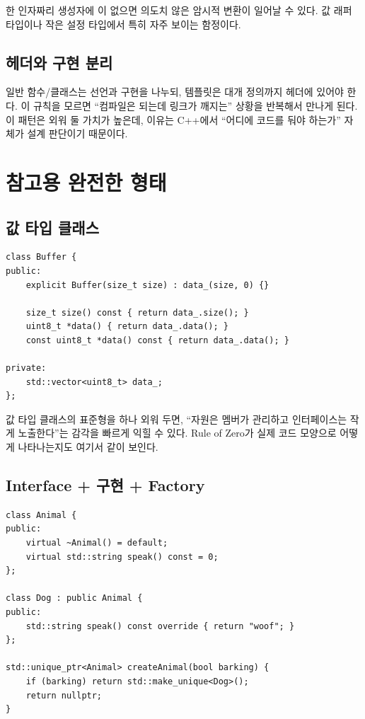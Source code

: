 \documentclass[11pt,a4paper]{book}
\DeclareRobustCommand{\code}[1]{\texttt{\detokenize{#1}}}
\begin{document}
한 인자짜리 생성자에 \code{explicit}이 없으면 의도치 않은 암시적 변환이 일어날 수 있다. 값 래퍼 타입이나 작은 설정 타입에서 특히 자주 보이는 함정이다.

\section{헤더와 구현 분리}

일반 함수/클래스는 선언과 구현을 나누되, 템플릿은 대개 정의까지 헤더에 있어야 한다. 이 규칙을 모르면 ``컴파일은 되는데 링크가 깨지는'' 상황을 반복해서 만나게 된다. 이 패턴은 외워 둘 가치가 높은데, 이유는 C++에서 ``어디에 코드를 둬야 하는가'' 자체가 설계 판단이기 때문이다.

\chapter{참고용 완전한 형태}

\section{값 타입 클래스}

\begin{lstlisting}[style=cpp,title={데이터를 담는 정석적 클래스}]
class Buffer {
public:
    explicit Buffer(size_t size) : data_(size, 0) {}

    size_t size() const { return data_.size(); }
    uint8_t *data() { return data_.data(); }
    const uint8_t *data() const { return data_.data(); }

private:
    std::vector<uint8_t> data_;
};
\end{lstlisting}

값 타입 클래스의 표준형을 하나 외워 두면, ``자원은 멤버가 관리하고 인터페이스는 작게 노출한다''는 감각을 빠르게 익힐 수 있다. Rule of Zero가 실제 코드 모양으로 어떻게 나타나는지도 여기서 같이 보인다.

\section{Interface + 구현 + Factory}

\begin{lstlisting}[style=cpp,title={상속 계층의 표준형}]
class Animal {
public:
    virtual ~Animal() = default;
    virtual std::string speak() const = 0;
};

class Dog : public Animal {
public:
    std::string speak() const override { return "woof"; }
};

std::unique_ptr<Animal> createAnimal(bool barking) {
    if (barking) return std::make_unique<Dog>();
    return nullptr;
}
\end{lstlisting}
\end{document}
